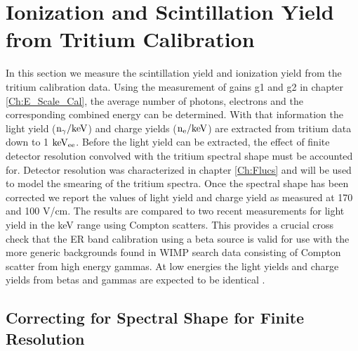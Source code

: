 \renewcommand{\thechapter}{6}

\chapter{Ionization and Scintillation Yield from Tritium Calibration}
\label{Ch:LYQY}

In this section we measure the scintillation yield and ionization yield from the tritium calibration data. Using the measurement of gains g1 and g2 in chapter \ref{Ch:E_Scale_Cal}, the average number of photons, electrons and the corresponding combined energy can be determined. With that information the light yield ($\rm n_\gamma/keV$) and charge yields ($\rm n_e/keV$) are extracted from tritium data down to 1 $\rm keV_{ee}$. Before the light yield can be extracted, the effect of finite detector resolution convolved with the tritium spectral shape must be accounted for. Detector resolution was characterized in chapter \ref{Ch:Flucs} and will be used to model the smearing of the tritium spectra. Once the spectral shape has been corrected we report the values of light yield and charge yield as measured at 170 and 100 V/cm. The results are compared to two recent measurements for light yield in the keV range using Compton scatters. This provides a crucial cross check that the ER band calibration using a beta source is valid for use with the more generic backgrounds found in WIMP search data consisting of Compton scatter from high energy gammas. At low energies the light yields and charge yields from betas and gammas are expected to be identical \cite{NEST} \cite{NEST_2013}.


\section{Correcting for Spectral Shape for Finite Resolution}
\label{sec:Smear}

